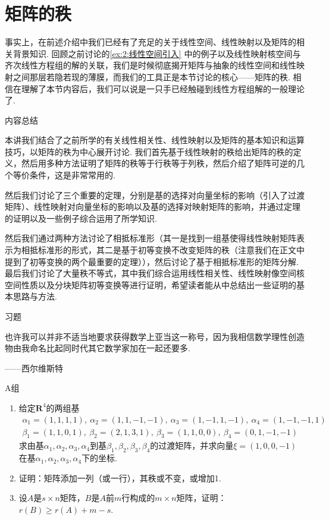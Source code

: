 \chapter{矩阵的秩}

事实上，在前述介绍中我们已经有了充足的关于线性空间、线性映射以及矩阵的相关背景知识. 回顾之前讨论的\autoref{ex:2:线性空间引入} 中的例子以及线性映射核空间与齐次线性方程组的解的关联，我们是时候彻底揭开矩阵与抽象的线性空间和线性映射之间那层若隐若现的薄膜，而我们的工具正是本节讨论的核心——矩阵的秩. 相信在理解了本节内容后，我们可以说是一只手已经触碰到线性方程组解的一般理论了.

\vspace{2ex}
\centerline{\heiti \Large 内容总结}

本讲我们结合了之前所学的有关线性相关性、线性映射以及矩阵的基本知识和运算技巧，以矩阵的秩为中心展开讨论. 我们首先基于线性映射的秩给出矩阵的秩的定义，然后用多种方法证明了矩阵的秩等于行秩等于列秩，然后介绍了矩阵可逆的几个等价条件，这是非常常用的.

然后我们讨论了三个重要的定理，分别是基的选择对向量坐标的影响（引入了过渡矩阵）、线性映射对向量坐标的影响以及基的选择对映射矩阵的影响，并通过定理的证明以及一些例子综合运用了所学知识.

然后我们通过两种方法讨论了相抵标准形（其一是找到一组基使得线性映射矩阵表示为相抵标准形的形式，其二是基于初等变换不改变矩阵的秩（注意我们在正文中提到了初等变换的两个最重要的定理）），然后讨论了基于相抵标准形的矩阵分解. 最后我们讨论了大量秩不等式，其中我们综合运用线性相关性、线性映射像空间核空间性质以及分块矩阵初等变换等进行证明，希望读者能从中总结出一些证明的基本思路与方法.

\vspace{2ex}
\centerline{\heiti \Large 习题}

\vspace{2ex}
{\kaishu 也许我可以并非不适当地要求获得数学上亚当这一称号，因为我相信数学理性创造物由我命名比起同时代其它数学家加在一起还要多.}
\begin{flushright}
    \kaishu
    ——西尔维斯特
\end{flushright}

\centerline{\heiti A组}
\begin{enumerate}
    \item 给定$\mathbf{R}^4$的两组基
          \begin{gather*}
              \alpha_1=(1,1,1,1),\ \alpha_2=(1,1,-1,-1),\ \alpha_3=(1,-1,1,-1),\ \alpha_4=(1,-1,-1,1) \\
              \beta_1=(1,1,0,1),\ \beta_2=(2,1,3,1),\ \beta_3=(1,1,0,0),\ \beta_4=(0,1,-1,-1)
          \end{gather*}
          求由基$\alpha_1,\alpha_2,\alpha_3,\alpha_4$到基$\beta_1,\beta_2,\beta_3,\beta_4$的过渡矩阵，并求向量$\xi=(1,0,0,-1)$在基$\alpha_1,\alpha_2,\alpha_3,\alpha_4$下的坐标.

    \item 证明：矩阵添加一列（或一行），其秩或不变，或增加1.

    \item 设$A$是$s \times n$矩阵，$B$是$A$前$m$行构成的$m \times n$矩阵，证明：$r(B) \geqslant r(A) + m - s$.
\end{enumerate}

